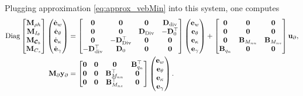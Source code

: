 Plugging approximation \eqref{eq:approx_vebMin} into this system, one computes
\begin{equation}
\begin{aligned}
\mathrm{Diag}\begin{bmatrix}
\mathbf{M}_{\rho h}\\
\mathbf{M}_{I_\theta}\\
\mathbf{M}_{\bm{\mathcal{C}}_b}\\
\mathbf{M}_{{C}_s} \\
\end{bmatrix}
\begin{pmatrix}
\dot{\mathbf{e}}_{w} \\
\dot{\mathbf{e}}_{\theta} \\
\dot{\mathbf{e}}_{\kappa} \\
\dot{\mathbf{e}}_{\gamma} \\
\end{pmatrix}
&= \begin{bmatrix}
\mathbf{0} & \mathbf{0} & \mathbf{0} & \mathbf{D}_{\operatorname{div}} \\
\mathbf{0} & \mathbf{0} & \mathbf{D}_{\operatorname*{Div}} & -\mathbf{D}_{0}^\top \\
\mathbf{0} & -\mathbf{D}_{\operatorname*{Div}}^\top & \mathbf{0} & \mathbf{0}\\
-\mathbf{D}_{\operatorname{div}}^\top & \mathbf{D}_{0} & \mathbf{0} & \mathbf{0}\\
\end{bmatrix} 
\begin{pmatrix}
{\mathbf{e}}_{w} \\
{\mathbf{e}}_{\theta} \\
{\mathbf{e}}_{\kappa} \\
{\mathbf{e}}_{\gamma} \\
\end{pmatrix} + 
\begin{bmatrix}
\mathbf{0} & \mathbf{0} & \mathbf{0} \\
\mathbf{0} & \mathbf{0} & \mathbf{0} \\
\mathbf{0} & \mathbf{B}_{M_{nn}} & \mathbf{B}_{M_{ns}}\\
\mathbf{B}_{q_n} & \mathbf{0} & \mathbf{0} \\
\end{bmatrix}
\mathbf{u}_\partial, \\
\mathbf{M}_\partial {\mathbf{y}_\partial} &= \begin{bmatrix}
\mathbf{0} & \mathbf{0} & \mathbf{0} & \mathbf{B}_{q_n}^\top \\
\mathbf{0} & \mathbf{0} & \mathbf{B}_{M_{nn}}^\top & \mathbf{0} \\ 
\mathbf{0} & \mathbf{0} & \mathbf{B}_{M_{ns}}^\top & \mathbf{0} \\ 
\end{bmatrix}
\begin{pmatrix}
{\mathbf{e}}_{w} \\
{\mathbf{e}}_{\theta} \\
{\mathbf{e}}_{\kappa} \\
{\mathbf{e}}_{\gamma} \\
\end{pmatrix}.
\end{aligned}
\end{equation}
